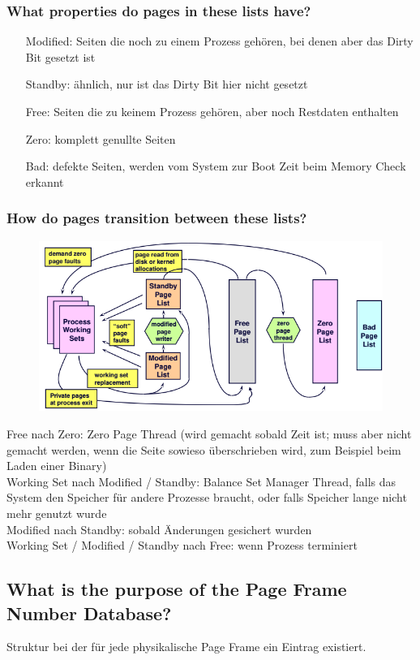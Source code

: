 \subsubsection{What properties do pages in these lists have?}
\begin{itemize}
    \item[Modified:] Seiten die noch zu einem Prozess gehören, bei denen aber das Dirty Bit gesetzt ist
    \item[Standby:] ähnlich, nur ist das Dirty Bit hier nicht gesetzt
    \item[Free:] Seiten die zu keinem Prozess gehören, aber noch Restdaten enthalten
    \item[Zero:] komplett genullte Seiten
    \item[Bad:] defekte Seiten, werden vom System zur Boot Zeit beim Memory Check erkannt
\end{itemize}

\subsubsection{How do pages transition between these lists?}
\begin{figure}[H]
	\centering
	\includegraphics[width=0.7\linewidth]{Pictures/PageLists}
\end{figure}

Free nach Zero: Zero Page Thread (wird gemacht sobald Zeit ist; muss aber nicht gemacht werden, wenn die Seite sowieso überschrieben wird, zum Beispiel beim Laden einer Binary)\\
Working Set nach Modified / Standby: Balance Set Manager Thread, falls das System den Speicher für andere Prozesse braucht, oder falls Speicher lange nicht mehr genutzt wurde\\
Modified nach Standby: sobald Änderungen gesichert wurden\\
Working Set / Modified / Standby nach Free: wenn Prozess terminiert

\subsection{What is the purpose of the Page Frame Number Database?}
Struktur bei der für jede physikalische Page Frame ein Eintrag existiert.

